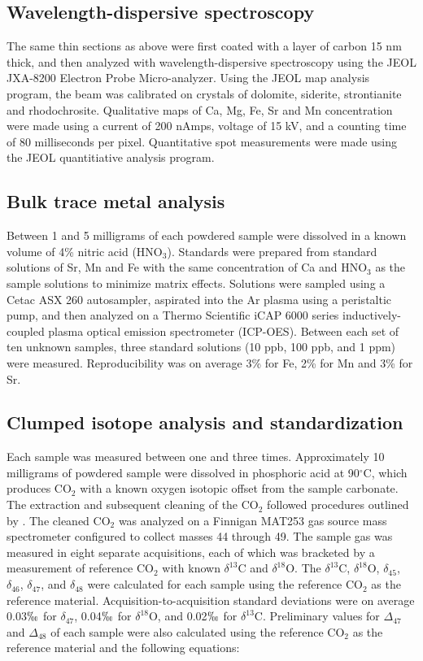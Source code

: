 \documentclass{article}
\newcommand{\deltao}{$\delta^{18}$}
\newcommand{\deltac}{$\delta^{13}$}
\newcommand{\degrees}{$^{\circ}$}
\begin{document}
\subsection{Wavelength-dispersive spectroscopy}

The same thin sections as above were first coated with a layer of carbon 15 nm thick, and then analyzed with wavelength-dispersive spectroscopy using the JEOL JXA-8200 Electron Probe Micro-analyzer. Using the JEOL map analysis program, the beam was calibrated on crystals of dolomite, siderite, strontianite and rhodochrosite. Qualitative maps of Ca, Mg, Fe, Sr and Mn concentration were made using a current of 200 nAmps, voltage of 15 kV, and a counting time of 80 milliseconds per pixel. Quantitative spot measurements were made using the JEOL quantitiative analysis program. 

\subsection{Bulk trace metal analysis}

Between 1 and 5 milligrams of each powdered sample were dissolved in a known volume of 4\% nitric acid (HNO$_3$). Standards were prepared from standard solutions of Sr, Mn and Fe with the same concentration of Ca and HNO$_3$ as the sample solutions to minimize matrix effects. Solutions were sampled using a Cetac ASX 260 autosampler, aspirated into the Ar plasma using a peristaltic pump, and then analyzed on a Thermo Scientific iCAP 6000 series inductively-coupled plasma optical emission spectrometer (ICP-OES). Between each set of ten unknown samples, three standard solutions (10 ppb, 100 ppb, and 1 ppm) were measured. Reproducibility was on average 3\% for Fe, 2\% for Mn and 3\% for Sr. 

\subsection{Clumped isotope analysis and standardization}

Each sample was measured between one and three times. Approximately 10 milligrams of powdered sample were dissolved in phosphoric acid at 90\degrees C, which produces CO$_2$ with a known oxygen isotopic offset from the sample carbonate. The extraction and subsequent cleaning of the CO$_2$ followed procedures outlined by \cite{Ghosh2006}. The cleaned CO$_2$ was analyzed on a Finnigan MAT253 gas source mass spectrometer configured to collect masses 44 through 49. The sample gas was measured in eight separate acquisitions, each of which was bracketed by a measurement of reference CO$_2$ with known \deltac C and \deltao O. The \deltac C, \deltao O, $\delta_{45}$, $\delta_{46}$, $\delta_{47}$, and $\delta_{48}$ were calculated for each sample using the reference CO$_2$ as the reference material. Acquisition-to-acquisition standard deviations were on average 0.03$\permil$ for $\delta_{47}$, 0.04$\permil$ for \deltao O, and 0.02$\permil$ for \deltac C. Preliminary values for $\Delta_{47}$ and $\Delta_{48}$ of each sample were also calculated using the reference CO$_2$ as the reference material and the following equations:
\end{document}
